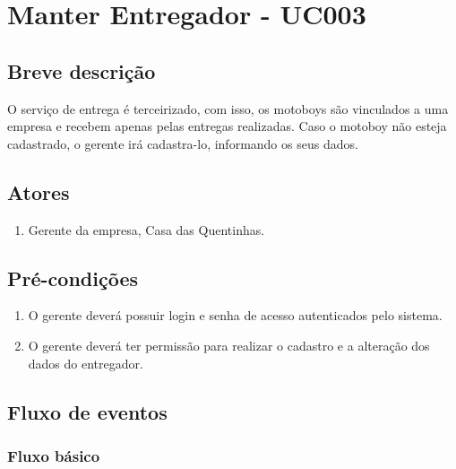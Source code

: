 \chapter{Manter Entregador - UC003} \label{uc003}

\section{Breve descrição}

O serviço de entrega é terceirizado, com isso, os motoboys são vinculados a uma empresa e recebem apenas pelas entregas realizadas. Caso o motoboy não esteja cadastrado, o gerente irá cadastra-lo, informando os seus dados.

\section{Atores}

\begin{enumerate}
	\item Gerente da empresa, Casa das Quentinhas.
\end{enumerate}

\section{Pré-condições}

\begin{enumerate}
	\item O gerente deverá possuir login e senha de acesso autenticados pelo sistema.
	\item O gerente deverá ter permissão para realizar o cadastro e a alteração dos dados do entregador.
\end{enumerate}

\section{Fluxo de eventos}

\subsection{Fluxo básico}

